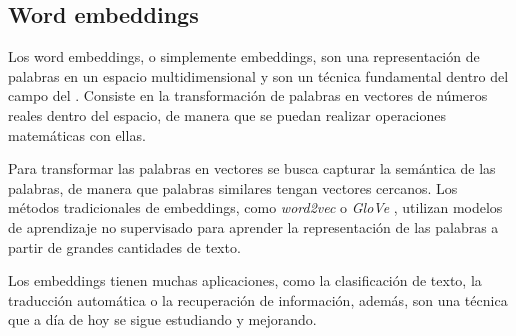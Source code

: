 \subsection{Word embeddings}
Los word embeddings, o simplemente embeddings, son una representación de palabras en un espacio multidimensional y son un técnica fundamental dentro del campo del . Consiste en la transformación de palabras en vectores de números reales dentro del espacio, de manera que se puedan realizar operaciones matemáticas con ellas.

Para transformar las palabras en vectores se busca capturar la semántica de las palabras, de manera que palabras similares tengan vectores cercanos. Los métodos tradicionales de embeddings, como \textit{word2vec} \cite{mikolov2013efficient} o \textit{GloVe} \cite{pennington2014glove}, utilizan modelos de aprendizaje no supervisado para aprender la representación de las palabras a partir de grandes cantidades de texto.

Los embeddings tienen muchas aplicaciones, como la clasificación de texto, la traducción automática o la recuperación de información, además, son una técnica que a día de hoy se sigue estudiando y mejorando.